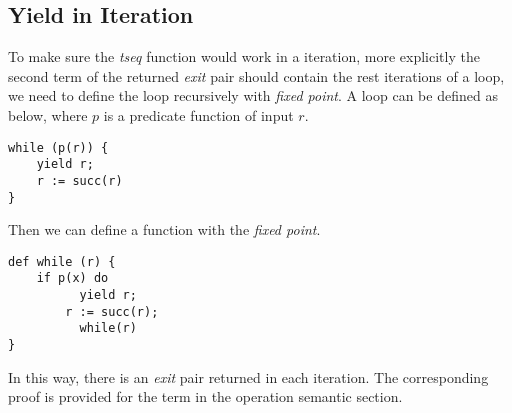\subsection{Yield in Iteration}
To make sure the \textit{tseq} function would work in a iteration, more explicitly the second term of the returned  \textit{exit} pair should contain the rest iterations of a loop, we need to define the loop recursively with \textit{fixed point}. A \while loop can be defined as below, where $p$ is a predicate function of input $r$.
\begin{lstlisting}[basicstyle=\small]
while (p(r)) {
	yield r; 
	r := succ(r)
}
\end{lstlisting}
Then we can define a \while function with the \textit{fixed point}.
\begin{lstlisting}[basicstyle=\small]
def while (r) {
	if p(x) do
		  yield r; 
	    r := succ(r);
		  while(r)
}
\end{lstlisting}
In this way, there is an \textit{exit} pair returned in each \while iteration. The corresponding proof is provided for the \while term in the operation semantic section.

